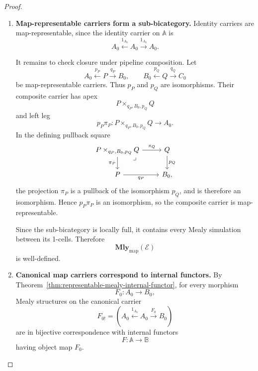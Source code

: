 \begin{proof}
    \leavevmode
    \begin{enumerate}
        \item \textbf{Map-representable carriers form a sub-bicategory.}
        Identity carriers are map-representable, since the identity carrier on
        \(\mathbb A\) is
        \[
            A_0
            \xleftarrow{1_{A_0}}
            A_0
            \xrightarrow{1_{A_0}}
            A_0.
        \]

        It remains to check closure under pipeline composition. Let
        \[
            A_0\xleftarrow{p_P}P\xrightarrow{q_P}B_0,
            \qquad
            B_0\xleftarrow{p_Q}Q\xrightarrow{q_Q}C_0
        \]
        be map-representable carriers. Thus \(p_P\) and \(p_Q\) are
        isomorphisms. Their composite carrier has apex
        \[
            P\times_{q_P,B_0,p_Q}Q
        \]
        and left leg
        \[
            p_P\pi_P:
            P\times_{q_P,B_0,p_Q}Q\to A_0.
        \]
        In the defining pullback square
        \[
            \begin{tikzcd}
                    P\times_{q_P,B_0,p_Q}Q
                        \arrow[r, "\pi_Q"]
                        \arrow[d, "\pi_P"']
                        \arrow[dr, phantom, "\lrcorner", very near start]
                &
                    Q
                        \arrow[d, "p_Q"]
                \\
                    P
                        \arrow[r, "q_P"']
                &
                    B_0,
            \end{tikzcd}
        \]
        the projection \(\pi_P\) is a pullback of the isomorphism \(p_Q\), and
        is therefore an isomorphism. Hence \(p_P\pi_P\) is an isomorphism, so
        the composite carrier is map-representable.

        Since the sub-bicategory is locally full, it contains every Mealy
        simulation between its 1-cells. Therefore
        \[
            \mathbf{Mly}_{\mathrm{map}}(\mathcal E)
        \]
        is well-defined.

        \item \textbf{Canonical map carriers correspond to internal functors.}
        By Theorem~\ref{thm:representable-mealy-internal-functor}, for every
        morphism
        \[
            F_0:A_0\to B_0,
        \]
        Mealy structures on the canonical carrier
        \[
            F_{0!}
            =
            \left(
                A_0
                \xleftarrow{1_{A_0}}
                A_0
                \xrightarrow{F_0}
                B_0
            \right)
        \]
        are in bijective correspondence with internal functors
        \[
            F:\mathbb A\to\mathbb B
        \]
        having object map \(F_0\).


\end{enumerate}
\end{proof}
